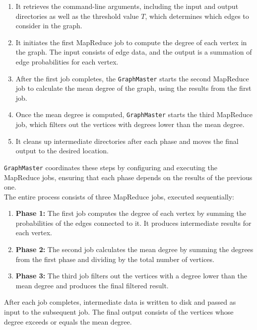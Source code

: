 \documentclass[acmlarge]{acmart}
\begin{document}
\begin{enumerate}
  \item It retrieves the command-line arguments, including the input and output directories as well as the threshold
        value \( T \), which determines which edges to consider in the graph.
  \item It initiates the first MapReduce job to compute the degree of each vertex in the graph.
        The input consists of edge data, and the output is a summation of edge probabilities for each vertex.
  \item After the first job completes, the \texttt{GraphMaster} starts the second MapReduce job to calculate the mean
        degree of the graph, using the results from the first job.
  \item Once the mean degree is computed, \texttt{GraphMaster} starts the third MapReduce job, which filters out the
        vertices with degrees lower than the mean degree.
  \item It cleans up intermediate directories after each phase and moves the final output to the desired location.
\end{enumerate}

\texttt{GraphMaster} coordinates these steps by configuring and executing the MapReduce jobs, ensuring that each phase
depends on the results of the previous one. \\

The entire process consists of three MapReduce jobs, executed sequentially:

\begin{enumerate}
  \item \textbf{Phase 1:} The first job computes the degree of each vertex by summing the probabilities of the edges
        connected to it.
        It produces intermediate results for each vertex.
  \item \textbf{Phase 2:} The second job calculates the mean degree by summing the degrees from the first phase and
        dividing by the total number of vertices.
  \item \textbf{Phase 3:} The third job filters out the vertices with a degree lower than the mean degree and produces
        the final filtered result.
\end{enumerate}

After each job completes, intermediate data is written to disk and passed as input to the subsequent job.
The final output consists of the vertices whose degree exceeds or equals the mean degree. \\
\end{document}
